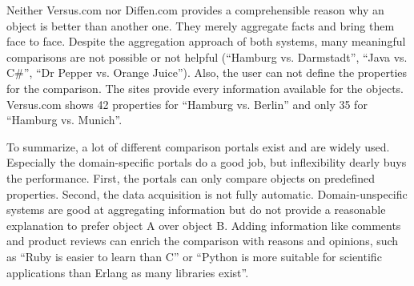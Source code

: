 Neither Versus.com nor Diffen.com provides a comprehensible reason why an object is better than another one. They merely aggregate facts and bring them face to face. Despite the aggregation approach of both systems, many meaningful comparisons are not possible or not helpful (\enquote{Hamburg vs. Darmstadt}, \enquote{Java vs. C\#}, \enquote{Dr Pepper vs. Orange Juice}).
Also, the user can not define the properties for the comparison. The sites provide every information available for the objects. Versus.com shows 42 properties for \enquote{Hamburg vs. Berlin} and only 35 for \enquote{Hamburg vs. Munich}.
\newline

To summarize, a lot of different comparison portals exist and are widely used. Especially the domain-specific portals do a good job, but inflexibility dearly buys the performance. First, the portals can only compare objects on predefined properties. Second, the data acquisition is not fully automatic. Domain-unspecific systems are good at aggregating information but do not provide a reasonable explanation to prefer object A over object B. Adding information like comments and product reviews can enrich the comparison with reasons and opinions, such as \enquote{Ruby is easier to learn than C} or \enquote{Python is more suitable for scientific applications than Erlang as many libraries exist}.